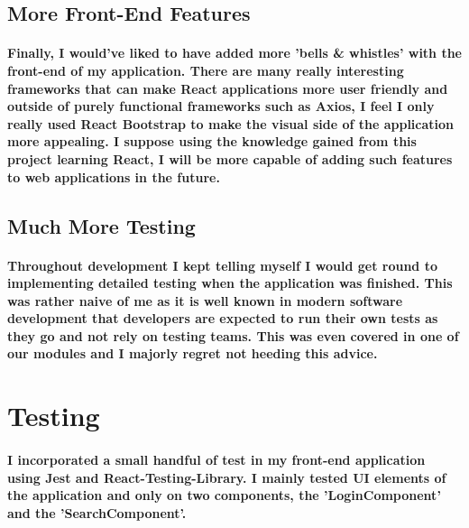 \subsection{More Front-End Features}
\paragraph{Finally, I would've liked to have added more 'bells \& whistles' with the front-end of my application. There are many really interesting frameworks that can make React applications more user friendly and outside of purely functional frameworks such as Axios, I feel I only really used React Bootstrap to make the visual side of the application more appealing. I suppose using the knowledge gained from this project learning React, I will be more capable of adding such features to web applications in the future.}

\subsection{Much More Testing}
\paragraph{Throughout development I kept telling myself I would get round to implementing detailed testing when the application was finished. This was rather naive of me as it is well known in modern software development that developers are expected to run their own tests as they go and not rely on testing teams. This was even covered in one of our modules and I majorly regret not heeding this advice.}
\section{Testing}
\paragraph{I incorporated a small handful of test in my front-end application using Jest and React-Testing-Library. I mainly tested UI elements of the application and only on two components, the 'LoginComponent' and the 'SearchComponent'.}
